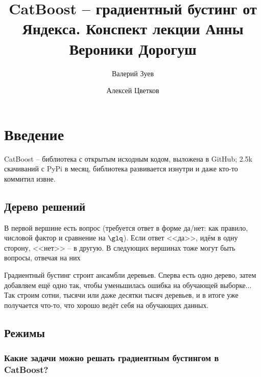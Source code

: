 \documentclass[a4paper,12pt]{article}
\begin{document}
\title{CatBoost -- градиентный бустинг от Яндекса. Конспект лекции Анны Вероники Дорогуш}

\author{
    Валерий Зуев \\
    \and
    Алексей Цветков
}

\maketitle

\section{Введение}

CatBoost -- библиотека с открытым исходным кодом, выложена в GitHub; 2.5k скачиваний с PyPi в месяц, библиотека развивается изнутри и даже кто-то коммитил извне.

\subsection{Дерево решений}
В первой вершине есть вопрос (требуется ответ в форме да/нет: как правило, числовой фактор и сравнение на $\glq$). Если ответ <<да>>, идём в одну сторону, <<нет>> -- в другую.
В следующих вершинах тоже могут быть вопросы, отвечая на них

Градиентный бустинг строит ансамбли деревьев.
Сперва есть одно дерево, затем добавляем ещё одно так, чтобы уменьшилась ошибка на обучающей выборке...
Так строим сотни, тысячи или даже десятки тысяч деревьев, и в итоге уже получается что-то, что хорошо ведёт себя на обучающих данных.

\subsection{Режимы}

\subsubsection{Какие задачи можно решать градиентным бустингом в CatBoost?}
\end{document}
